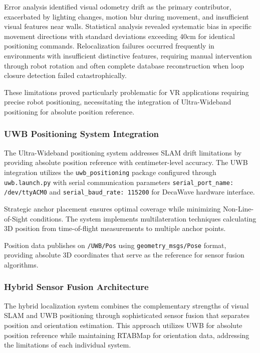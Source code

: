 Error analysis identified visual odometry drift as the primary contributor, exacerbated by lighting changes, motion blur during movement, and insufficient visual features near walls. Statistical analysis revealed systematic bias in specific movement directions with standard deviations exceeding 40cm for identical positioning commands. Relocalization failures occurred frequently in environments with insufficient distinctive features, requiring manual intervention through robot rotation and often complete database reconstruction when loop closure detection failed catastrophically.

These limitations proved particularly problematic for VR applications requiring precise robot positioning, necessitating the integration of Ultra-Wideband positioning for absolute position reference.

\subsubsection{UWB Positioning System Integration}

The Ultra-Wideband positioning system addresses SLAM drift limitations by providing absolute position reference with centimeter-level accuracy. The UWB integration utilizes the \texttt{uwb\_positioning} package configured through \texttt{uwb.launch.py} with serial communication parameters \texttt{serial\_port\_name: /dev/ttyACM0} and \texttt{serial\_baud\_rate: 115200} for DecaWave hardware interface.

Strategic anchor placement ensures optimal coverage while minimizing Non-Line-of-Sight conditions. The system implements multilateration techniques calculating 3D position from time-of-flight measurements to multiple anchor points.

Position data publishes on \texttt{/UWB/Pos} using \texttt{geometry\_msgs/Pose} format, providing absolute 3D coordinates that serve as the reference for sensor fusion algorithms.

\subsubsection{Hybrid Sensor Fusion Architecture}

The hybrid localization system combines the complementary strengths of visual SLAM and UWB positioning through sophisticated sensor fusion that separates position and orientation estimation. This approach utilizes UWB for absolute position reference while maintaining RTABMap for orientation data, addressing the limitations of each individual system.

